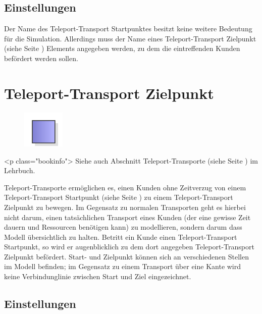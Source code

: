 \subsection*{Einstellungen}

Der Name des Teleport-Transport Startpunktes besitzt keine weitere Bedeutung
für die Simulation. Allerdings muss der Name eines
Teleport-Transport Zielpunkt (siehe Seite \pageref{ref:ModelElementTeleportDestination}) 
Elements angegeben werden, zu dem die eintreffenden Kunden befördert werden sollen.


\section{Teleport-Transport Zielpunkt}
\label{ref:ModelElementTeleportDestination}

\begin{figure}
\vspace{-22pt}
\includegraphics[width=2cm]{imageModelElementTeleportDestination.png}
\vspace{-22pt}
\end{figure}

<p class="bookinfo">
Siehe auch Abschnitt Teleport-Transporte (siehe Seite \pageref{ref:book:8.3.5}) im Lehrbuch.

Teleport-Transporte ermöglichen es, einen Kunden ohne Zeitverzug
von einem Teleport-Transport Startpunkt (siehe Seite \pageref{ref:ModelElementTeleportSource}) 
zu einem Teleport-Transport Zielpunkt zu bewegen. Im Gegensatz zu normalen
Transporten geht es hierbei nicht darum, einen tatsächlichen Transport eines Kunden
(der eine gewisse Zeit dauern und Ressourcen benötigen kann) zu modellieren,
sondern darum dass Modell übersichtlich zu halten. Betritt ein Kunde einen
Teleport-Transport Startpunkt, so wird er augenblicklich zu dem dort angegeben
Teleport-Transport Zielpunkt befördert.
Start- und Zielpunkt können sich an verschiedenen Stellen im Modell befinden;
im Gegensatz zu einem Transport über eine Kante wird keine Verbindunglinie
zwischen Start und Ziel eingezeichnet.

\subsection*{Einstellungen}

